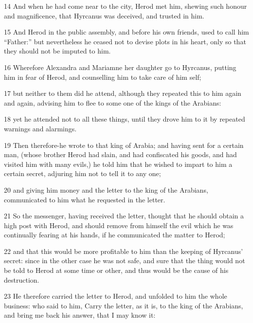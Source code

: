 \par 14 And when he had come near to the city, Herod met him, shewing such honour and magnificence, that Hyrcanus was deceived, and trusted in him. 

\par 15 And Herod in the public assembly, and before his own friends, used to call him “Father:” but nevertheless he ceased not to devise plots in his heart, only so that they should not be imputed to him. 

\par 16 Wherefore Alexandra and Mariamne her daughter go to Hyrcanus, putting him in fear of Herod, and counselling him to take care of him self; 

\par 17 but neither to them did he attend, although they repeated this to him again and again, advising him to flee to some one of the kings of the Arabians: 

\par 18 yet he attended not to all these things, until they drove him to it by repeated warnings and alarmings. 

\par 19 Then therefore-he wrote to that king of Arabia; and having sent for a certain man, (whose brother Herod had slain, and had confiscated his goods, and had visited him with many evils,) he told him that he wished to impart to him a certain secret, adjuring him not to tell it to any one; 

\par 20 and giving him money and the letter to the king of the Arabians, communicated to him what he requested in the letter. 

\par 21 So the messenger, having received the letter, thought that he should obtain a high post with Herod, and should remove from himself the evil which he was continually fearing at his hands, if he communicated the matter to Herod; 

\par 22 and that this would be more profitable to him than the keeping of Hyrcanus’ secret: since in the other case he was not safe, and sure that the thing would not be told to Herod at some time or other, and thus would be the cause of his destruction. 

\par 23 He therefore carried the letter to Herod, and unfolded to him the whole business: who said to him, Carry the letter, as it is, to the king of the Arabians, and bring me back his answer, that I may know it: 


